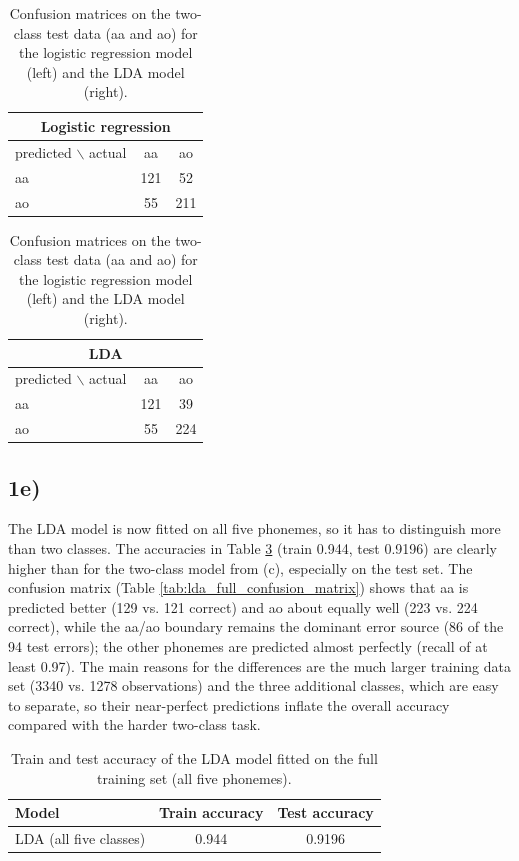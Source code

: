 \documentclass[a4paper]{scrartcl}
\begin{document}
\begin{table}[H]
  \centering
  \begin{tabular}{lcc}
    \multicolumn{3}{c}{Logistic regression} \\
    \hline
    predicted $\backslash$ actual & aa & ao \\ \hline
    aa & 121 & 52 \\
    ao & 55 & 211 \\ \hline
  \end{tabular}
  \qquad
  \begin{tabular}{lcc}
    \multicolumn{3}{c}{LDA} \\
    \hline
    predicted $\backslash$ actual & aa & ao \\ \hline
    aa & 121 & 39 \\
    ao & 55 & 224 \\ \hline
  \end{tabular}
  \caption{Confusion matrices on the two-class test data (aa and ao) for the logistic regression model (left) and the LDA model (right).}
  \label{tab:confusion_matrices_aa_ao}
\end{table}

\subsection*{1e)}

The LDA model is now fitted on all five phonemes, so it has to distinguish more than two classes.
The accuracies in Table \ref{tab:lda_full_accuracy} (train 0.944, test 0.9196) are clearly higher than for the two-class model from (c), especially on the test set.
The confusion matrix (Table \ref{tab:lda_full_confusion_matrix}) shows that aa is predicted better (129 vs. 121 correct) and ao about equally well (223 vs. 224 correct), while the aa/ao boundary remains the dominant error source (86 of the 94 test errors); the other phonemes are predicted almost perfectly (recall of at least 0.97).
The main reasons for the differences are the much larger training data set (3340 vs. 1278 observations) and the three additional classes, which are easy to separate, so their near-perfect predictions inflate the overall accuracy compared with the harder two-class task.

\begin{table}[H]
  \centering
  \begin{tabular}{lcc}
    \hline
    Model & Train accuracy & Test accuracy \\ \hline
    LDA (all five classes) & 0.944 & 0.9196 \\ \hline
  \end{tabular}
  \caption{Train and test accuracy of the LDA model fitted on the full training set (all five phonemes).}
  \label{tab:lda_full_accuracy}
\end{table}
\end{document}
